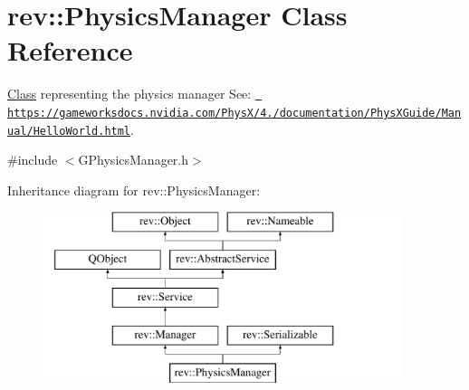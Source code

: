 \hypertarget{classrev_1_1_physics_manager}{}\section{rev\+::Physics\+Manager Class Reference}
\label{classrev_1_1_physics_manager}


\mbox{\hyperlink{struct_class}{Class}} representing the physics manager See\+: \href{https://gameworksdocs.nvidia.com/PhysX/4.0/documentation/PhysXGuide/Manual/HelloWorld.html}{\texttt{ https\+://gameworksdocs.\+nvidia.\+com/\+Phys\+X/4./documentation/\+Phys\+X\+Guide/\+Manual/\+Hello\+World.\+html}}.  




{\ttfamily \#include $<$G\+Physics\+Manager.\+h$>$}

Inheritance diagram for rev\+::Physics\+Manager\+:\begin{figure}[H]
\begin{center}
\leavevmode
\includegraphics[height=5.000000cm]{classrev_1_1_physics_manager}
\end{center}
\end{figure}
